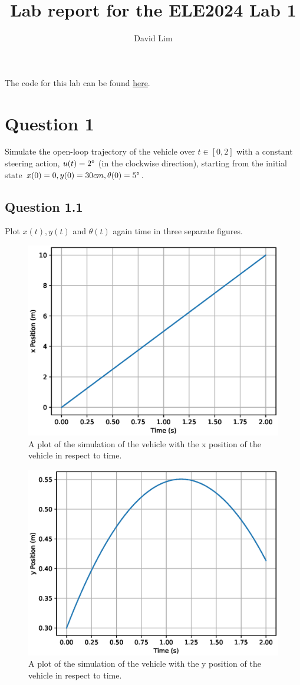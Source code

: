 \documentclass[a4paper,10pt,reqno]{amsart}
\title[ELE2024 Lab 1]{Lab report for the ELE2024 Lab 1}
\author[D. Lim]{David Lim}
\numberwithin{equation}{section}
\begin{document}
\maketitle

The code for this lab can be found \href{https://github.com/drlim2u/Lane-Keeping}{here}.

\section{Question 1}\label{sec:q1}
    Simulate the open-loop trajectory of the vehicle over \(t \in [0, 2]\) with a constant steering action, \(u(t) = 2\degree\) (in the clockwise direction), starting from the initial state \(x(0) = 0, y(0) = 30 cm, \theta(0) = 5\degree\).

    \subsection{Question 1.1}
    Plot \(x(t), y(t)\) and \(\theta(t)\) again time in three separate figures.
    \begin{figure}[h]
        \centering
        \includegraphics[width=0.6\linewidth]{figures/question_1_1_a.eps}
        \caption{A plot of the simulation of the vehicle with the x position of the vehicle in respect to time.}
    \end{figure}

    \begin{figure}[h]
        \centering
        \includegraphics[width=0.6\linewidth]{figures/question_1_1_b.eps}
        \caption{A plot of the simulation of the vehicle with the y position of the vehicle in respect to time.}
    \end{figure}
\end{document}
